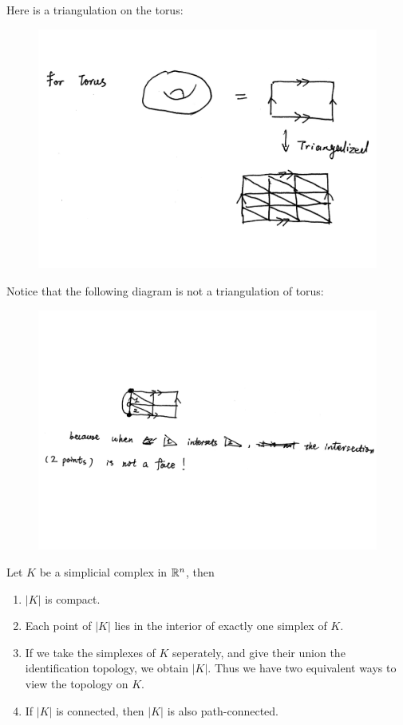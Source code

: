 \begin{ex}
    \label{ex:triangu-torus}
    Here is a triangulation on the torus:
    \begin{figure}[H]
        \centering
        \includegraphics[width=0.6\linewidth]{pics/ch6-scanned-notes-1/p5.pdf}
    \end{figure}
    Notice that the following diagram is not a triangulation of torus:
    \begin{figure}[H]
        \centering
        \includegraphics[width=0.8\linewidth]{pics/ch6-scanned-notes-1/p52.pdf}
    \end{figure}
\end{ex}
\begin{lemma}
    Let $K$ be a simplicial complex in $\mathbb{R}^{n}$, then
    \begin{enumerate}
        \item $|K|$ is compact.
        \item Each point of $|K|$ lies in the interior of exactly one
            simplex of $K$.
        \item If we take the simplexes of $K$ seperately, and give
            their union the identification topology, we obtain $|K|$.
            Thus we have two equivalent ways to view the topology on
            $K$.
        \item If $|K|$ is connected, then $|K|$ is also
            path-connected.
    \end{enumerate}
\end{lemma}
